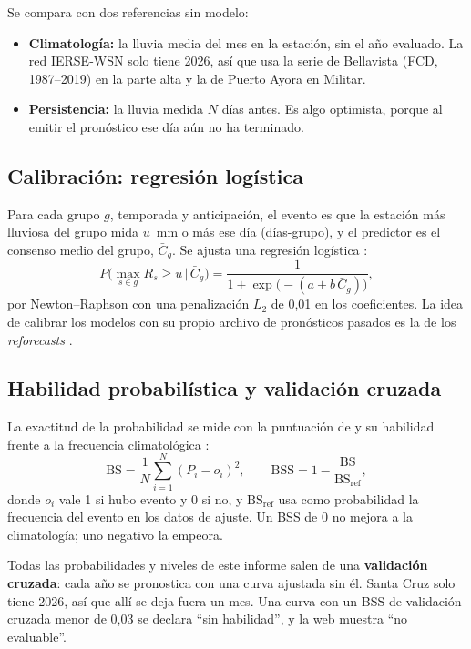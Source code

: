 \documentclass{sosg-informe}
\begin{document}
Se compara con dos referencias sin modelo:
\begin{itemize}
  \item \textbf{Climatología:} la lluvia media del mes en la estación, sin el año evaluado. La red IERSE-WSN solo tiene 2026, así que usa la serie de Bellavista (FCD, 1987--2019) en la parte alta y la de Puerto Ayora en Militar.
  \item \textbf{Persistencia:} la lluvia medida $N$ días antes. Es algo optimista, porque al emitir el pronóstico ese día aún no ha terminado.
\end{itemize}

\subsection{Calibración: regresión logística}
Para cada grupo $g$, temporada y anticipación, el evento es que la estación más lluviosa del grupo mida $u$~mm o más ese día (días-grupo), y el predictor es el consenso medio del grupo, $\bar C_g$. Se ajusta una regresión logística \citep{glahn1972,wilks2009}:
\begin{equation}
  P\bigl(\max_{s\in g} R_s \geq u \,\big|\, \bar C_g\bigr) = \frac{1}{1 + \exp\bigl(-(a + b\, \bar C_g)\bigr)},
\end{equation}
por Newton--Raphson con una penalización $L_2$ de 0,01 en los coeficientes. La idea de calibrar los modelos con su propio archivo de pronósticos pasados es la de los \emph{reforecasts} \citep{hamill2004}.

\subsection{Habilidad probabilística y validación cruzada}
La exactitud de la probabilidad se mide con la puntuación de \citet{brier1950} y su habilidad frente a la frecuencia climatológica \citep{wilks2011}:
\begin{equation}
  \mathrm{BS} = \frac{1}{N}\sum_{i=1}^{N}(P_i - o_i)^2, \qquad
  \mathrm{BSS} = 1 - \frac{\mathrm{BS}}{\mathrm{BS}_{\text{ref}}},
\end{equation}
donde $o_i$ vale 1 si hubo evento y 0 si no, y $\mathrm{BS}_{\text{ref}}$ usa como probabilidad la frecuencia del evento en los datos de ajuste. Un BSS de 0 no mejora a la climatología; uno negativo la empeora.

Todas las probabilidades y niveles de este informe salen de una \textbf{validación cruzada}: cada año se pronostica con una curva ajustada sin él. Santa Cruz solo tiene 2026, así que allí se deja fuera un mes. Una curva con un BSS de validación cruzada menor de 0,03 se declara \enquote{sin habilidad}, y la web muestra \enquote{no evaluable}.
\end{document}
